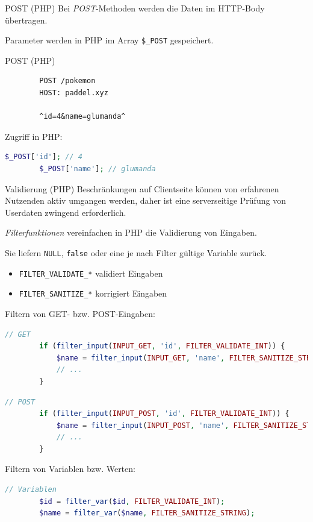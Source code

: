 \begin{defi}{POST (PHP)}
    Bei \emph{POST}-Methoden werden die Daten im HTTP-Body übertragen.

    Parameter werden in PHP im Array \texttt{\$\_POST} gespeichert.
\end{defi}

\begin{example}{POST (PHP)}
    \begin{lstlisting} 
        POST /pokemon
        HOST: paddel.xyz

        ^id=4&name=glumanda^
    \end{lstlisting}

    Zugriff in PHP:
    \begin{lstlisting}[language=php]
        $_POST['id']; // 4
        $_POST['name']; // glumanda
    \end{lstlisting}
\end{example}

\begin{defi}{Validierung (PHP)}
    Beschränkungen auf Clientseite können von erfahrenen Nutzenden aktiv umgangen werden, daher ist eine serverseitige Prüfung von Userdaten zwingend erforderlich.

    \emph{Filterfunktionen} vereinfachen in PHP die Validierung von Eingaben.

    Sie liefern \texttt{NULL}, \texttt{false} oder eine je nach Filter gültige Variable zurück.

    \begin{itemize}
        \item \texttt{FILTER\_VALIDATE\_*} validiert Eingaben
        \item \texttt{FILTER\_SANITIZE\_*} korrigiert Eingaben
    \end{itemize}

    Filtern von GET- bzw. POST-Eingaben:
    \begin{lstlisting}[language=php]
        // GET
        if (filter_input(INPUT_GET, 'id', FILTER_VALIDATE_INT)) {
            $name = filter_input(INPUT_GET, 'name', FILTER_SANITIZE_STRING); 
            // ...
        }
    \end{lstlisting}

    \begin{lstlisting}[language=php]
        // POST 
        if (filter_input(INPUT_POST, 'id', FILTER_VALIDATE_INT)) {
            $name = filter_input(INPUT_POST, 'name', FILTER_SANITIZE_STRING); 
            // ...
        }
    \end{lstlisting}

    Filtern von Variablen bzw. Werten:
    \begin{lstlisting}[language=php]
        // Variablen
        $id = filter_var($id, FILTER_VALIDATE_INT);
        $name = filter_var($name, FILTER_SANITIZE_STRING);
    \end{lstlisting}
\end{defi}

